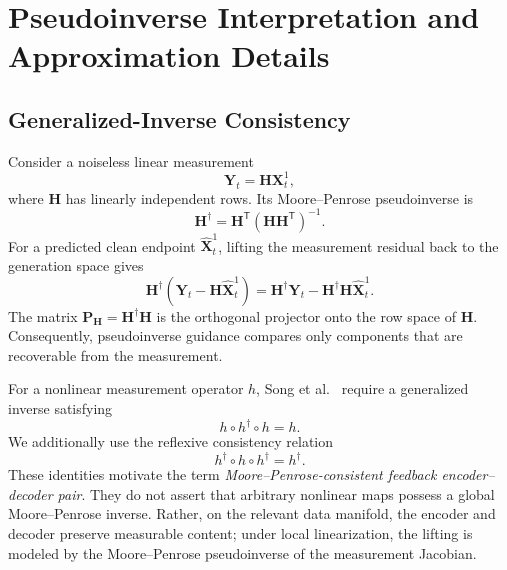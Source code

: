 
\section{Pseudoinverse Interpretation and Approximation Details}
\label{app:pseudoinverse}

\subsection{Generalized-Inverse Consistency}

Consider a noiseless linear measurement
\begin{equation}
    \mathbf{Y}_t=\mathbf{H}\mathbf{X}_t^1,
\end{equation}
where $\mathbf{H}$ has linearly independent rows. Its Moore--Penrose
pseudoinverse is
\begin{equation}
    \mathbf{H}^\dagger
    =
    \mathbf{H}^{\mathsf T}
    (\mathbf{H}\mathbf{H}^{\mathsf T})^{-1}.
\end{equation}
For a predicted clean endpoint $\hat{\mathbf{X}}_t^1$, lifting the measurement
residual back to the generation space gives
\begin{equation}
    \mathbf{H}^\dagger
    \left(
        \mathbf{Y}_t-\mathbf{H}\hat{\mathbf{X}}_t^1
    \right)
    =
    \mathbf{H}^\dagger\mathbf{Y}_t
    -
    \mathbf{H}^\dagger\mathbf{H}\hat{\mathbf{X}}_t^1.
\end{equation}
The matrix $\mathbf{P}_{\mathbf H}=\mathbf{H}^\dagger\mathbf{H}$ is the
orthogonal projector onto the row space of $\mathbf H$. Consequently,
pseudoinverse guidance compares only components that are recoverable from the
measurement.

For a nonlinear measurement operator $h$, Song et al.~\cite{song2023pseudoinverse}
require a generalized inverse satisfying
\begin{equation}
    h\circ h^\dagger\circ h=h.
\end{equation}
We additionally use the reflexive consistency relation
\begin{equation}
    h^\dagger\circ h\circ h^\dagger=h^\dagger.
\end{equation}
These identities motivate the term \emph{Moore--Penrose-consistent feedback
encoder--decoder pair}. They do not assert that arbitrary nonlinear maps possess a
global Moore--Penrose inverse. Rather, on the relevant data manifold, the encoder
and decoder preserve measurable content; under local linearization, the lifting is
modeled by the Moore--Penrose pseudoinverse of the measurement Jacobian.

